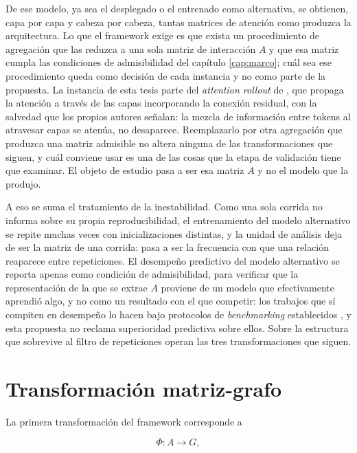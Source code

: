 De ese modelo, ya sea el desplegado o el entrenado como alternativa, se obtienen, capa por capa y cabeza por cabeza, tantas matrices de atención como produzca la arquitectura. Lo que el framework exige es que exista un procedimiento de agregación que las reduzca a una sola matriz de interacción $A$ y que esa matriz cumpla las condiciones de admisibilidad del capítulo \ref{cap:marco}; cuál sea ese procedimiento queda como decisión de cada instancia y no como parte de la propuesta. La instancia de esta tesis parte del \emph{attention rollout} de \textcite{abnar2020quantifying}, que propaga la atención a través de las capas incorporando la conexión residual, con la salvedad que los propios autores señalan: la mezcla de información entre tokens al atravesar capas se atenúa, no desaparece. Reemplazarlo por otra agregación que produzca una matriz admisible no altera ninguna de las transformaciones que siguen, y cuál conviene usar es una de las cosas que la etapa de validación tiene que examinar. El objeto de estudio pasa a ser esa matriz $A$ y no el modelo que la produjo.

A eso se suma el tratamiento de la inestabilidad. Como una sola corrida no informa sobre su propia reproducibilidad, el entrenamiento del modelo alternativo se repite muchas veces con inicializaciones distintas, y la unidad de análisis deja de ser la matriz de una corrida: pasa a ser la frecuencia con que una relación reaparece entre repeticiones. El desempeño predictivo del modelo alternativo se reporta apenas como condición de admisibilidad, para verificar que la representación de la que se extrae $A$ proviene de un modelo que efectivamente aprendió algo, y no como un resultado con el que competir: los trabajos que sí compiten en desempeño lo hacen bajo protocolos de \emph{benchmarking} establecidos \cite{liu2024itransformer, sentinel2025multipatch}, y esta propuesta no reclama superioridad predictiva sobre ellos. Sobre la estructura que sobrevive al filtro de repeticiones operan las tres transformaciones que siguen.

\section{Transformación matriz-grafo}

La primera transformación del framework corresponde a

\begin{equation}
\Phi : A \to G,
\end{equation}

